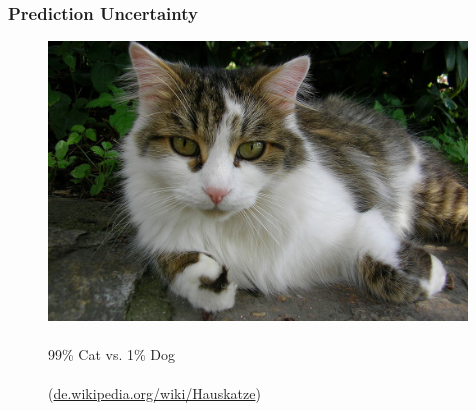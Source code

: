 \begin{frame}
	\frametitle{Prediction Uncertainty}
	
\begin{minipage}{0.3\textwidth}
\begin{figure}
\centering
\includegraphics[width=0.99\textwidth]{./intro_cat_c.jpg}
\caption{\\ 99\% Cat vs. 1\% Dog \\ \hfill \\ (\url{de.wikipedia.org/wiki/Hauskatze})}
\end{figure}
\end{minipage}
\begin{minipage}{0.3\textwidth}
\end{minipage}
\end{frame}
